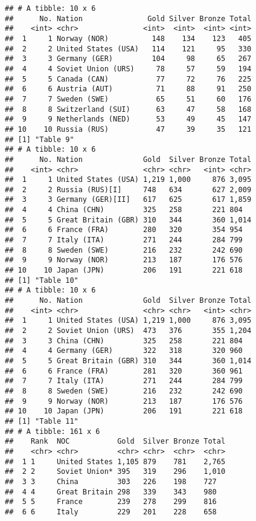 \documentclass[
]{article}
\begin{document}
\begin{verbatim}
## # A tibble: 10 x 6
##      No. Nation               Gold Silver Bronze Total
##    <int> <chr>               <int>  <int>  <int> <int>
##  1     1 Norway (NOR)          148    134    123   405
##  2     2 United States (USA)   114    121     95   330
##  3     3 Germany (GER)         104     98     65   267
##  4     4 Soviet Union (URS)     78     57     59   194
##  5     5 Canada (CAN)           77     72     76   225
##  6     6 Austria (AUT)          71     88     91   250
##  7     7 Sweden (SWE)           65     51     60   176
##  8     8 Switzerland (SUI)      63     47     58   168
##  9     9 Netherlands (NED)      53     49     45   147
## 10    10 Russia (RUS)           47     39     35   121
## [1] "Table 9"
## # A tibble: 10 x 6
##      No. Nation              Gold  Silver Bronze Total
##    <int> <chr>               <chr> <chr>   <int> <chr>
##  1     1 United States (USA) 1,219 1,000     876 3,095
##  2     2 Russia (RUS)[I]     748   634       627 2,009
##  3     3 Germany (GER)[II]   617   625       617 1,859
##  4     4 China (CHN)         325   258       221 804  
##  5     5 Great Britain (GBR) 310   344       360 1,014
##  6     6 France (FRA)        280   320       354 954  
##  7     7 Italy (ITA)         271   244       284 799  
##  8     8 Sweden (SWE)        216   232       242 690  
##  9     9 Norway (NOR)        213   187       176 576  
## 10    10 Japan (JPN)         206   191       221 618  
## [1] "Table 10"
## # A tibble: 10 x 6
##      No. Nation              Gold  Silver Bronze Total
##    <int> <chr>               <chr> <chr>   <int> <chr>
##  1     1 United States (USA) 1,219 1,000     876 3,095
##  2     2 Soviet Union (URS)  473   376       355 1,204
##  3     3 China (CHN)         325   258       221 804  
##  4     4 Germany (GER)       322   318       320 960  
##  5     5 Great Britain (GBR) 310   344       360 1,014
##  6     6 France (FRA)        281   320       360 961  
##  7     7 Italy (ITA)         271   244       284 799  
##  8     8 Sweden (SWE)        216   232       242 690  
##  9     9 Norway (NOR)        213   187       176 576  
## 10    10 Japan (JPN)         206   191       221 618  
## [1] "Table 11"
## # A tibble: 161 x 6
##    Rank  NOC           Gold  Silver Bronze Total
##    <chr> <chr>         <chr> <chr>  <chr>  <chr>
##  1 1     United States 1,105 879    781    2,765
##  2 2     Soviet Union* 395   319    296    1,010
##  3 3     China         303   226    198    727  
##  4 4     Great Britain 298   339    343    980  
##  5 5     France        239   278    299    816  
##  6 6     Italy         229   201    228    658  

\end{verbatim}
\end{document}
